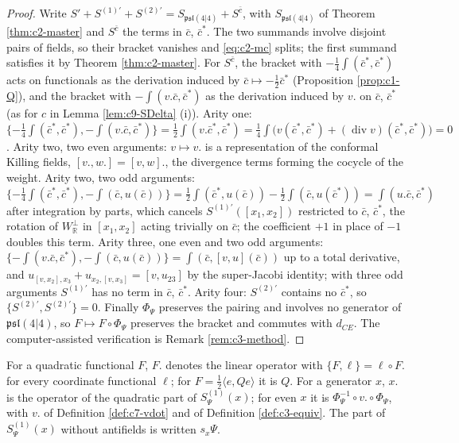 \begin{proof}
Write $S'+S^{(1)\prime}+S^{(2)\prime}=S_{\mathfrak{psl}(4|4)}+S^{\bar c}$, with $S_{\mathfrak{psl}(4|4)}$ of Theorem \ref{thm:c2-master} and $S^{\bar c}$ the terms in $\bar c$, $\bar c^*$. The two summands involve disjoint pairs of fields, so their bracket vanishes and \eqref{eq:c2-mc} splits; the first summand satisfies it by Theorem \ref{thm:c2-master}. For $S^{\bar c}$, the bracket with $-\tfrac14\int(\bar c^*,\bar c^*)$ acts on functionals as the derivation induced by $\bar c\mapsto-\tfrac12\bar c^*$ (Proposition \ref{prop:c1-Q}), and the bracket with $-\int(v.\bar c,\bar c^*)$ as the derivation induced by $v.$ on $\bar c$, $\bar c^*$ (as for $c$ in Lemma \ref{lem:c9-SDelta} (i)). Arity one: $\{-\tfrac14\int(\bar c^*,\bar c^*),-\int(v.\bar c,\bar c^*)\}=\tfrac12\int(v.\bar c^*,\bar c^*)=\tfrac14\int\big(v(\bar c^*,\bar c^*)+(\operatorname{div}v)(\bar c^*,\bar c^*)\big)=0$. Arity two, two even arguments: $v\mapsto v.$ is a representation of the conformal Killing fields, $[v.,w.]=[v,w].$, the divergence terms forming the cocycle of the weight. Arity two, two odd arguments: $\{-\tfrac14\int(\bar c^*,\bar c^*),-\int(\bar c,u(\bar c))\}=\tfrac12\int(\bar c^*,u(\bar c))-\tfrac12\int(\bar c,u(\bar c^*))=\int(u.\bar c,\bar c^*)$ after integration by parts, which cancels $S^{(1)\prime}([x_1,x_2])$ restricted to $\bar c$, $\bar c^*$, the rotation of $W_{\mathbb R}^\perp$ in $[x_1,x_2]$ acting trivially on $\bar c$; the coefficient $+1$ in place of $-1$ doubles this term. Arity three, one even and two odd arguments: $\{-\int(v.\bar c,\bar c^*),-\int(\bar c,u(\bar c))\}=\int(\bar c,[v,u](\bar c))$ up to a total derivative, and $u_{[v,x_2],x_3}+u_{x_2,[v,x_3]}=[v,u_{23}]$ by the super-Jacobi identity; with three odd arguments $S^{(1)\prime}$ has no term in $\bar c$, $\bar c^*$. Arity four: $S^{(2)\prime}$ contains no $\bar c^*$, so $\{S^{(2)\prime},S^{(2)\prime}\}=0$. Finally $\Phi_\Psi$ preserves the pairing and involves no generator of $\mathfrak{psl}(4|4)$, so $F\mapsto F\circ\Phi_\Psi$ preserves the bracket and commutes with $d_{CE}$. The computer-assisted verification is Remark \ref{rem:c3-method}.
\end{proof}

For a quadratic functional $F$, $F.$ denotes the linear operator with $\{F,\ell\}=\ell\circ F.$ for every coordinate functional $\ell$; for $F=\tfrac12\langle e,Qe\rangle$ it is $Q$. For a generator $x$, $x.$ is the operator of the quadratic part of $S^{(1)}_\Psi(x)$; for even $x$ it is $\Phi_\Psi^{-1}\circ v.\circ\Phi_\Psi$, with $v.$ of Definition \ref{def:c7-vdot} and of Definition \ref{def:c3-equiv}. The part of $S^{(1)}_\Psi(x)$ without antifields is written $s_x\Psi$.

